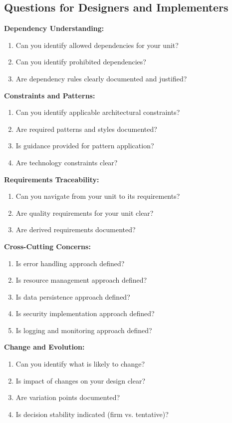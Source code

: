 \documentclass[11pt]{article}
\begin{document}
\subsection{Questions for Designers and Implementers}

\begin{questionbox}

\textbf{Dependency Understanding:}
\begin{enumerate}
    \item Can you identify allowed dependencies for your unit?
    \item Can you identify prohibited dependencies?
    \item Are dependency rules clearly documented and justified?
\end{enumerate}

\textbf{Constraints and Patterns:}
\begin{enumerate}[resume]
    \item Can you identify applicable architectural constraints?
    \item Are required patterns and styles documented?
    \item Is guidance provided for pattern application?
    \item Are technology constraints clear?
\end{enumerate}

\textbf{Requirements Traceability:}
\begin{enumerate}[resume]
    \item Can you navigate from your unit to its requirements?
    \item Are quality requirements for your unit clear?
    \item Are derived requirements documented?
\end{enumerate}

\textbf{Cross-Cutting Concerns:}
\begin{enumerate}[resume]
    \item Is error handling approach defined?
    \item Is resource management approach defined?
    \item Is data persistence approach defined?
    \item Is security implementation approach defined?
    \item Is logging and monitoring approach defined?
\end{enumerate}

\textbf{Change and Evolution:}
\begin{enumerate}[resume]
    \item Can you identify what is likely to change?
    \item Is impact of changes on your design clear?
    \item Are variation points documented?
    \item Is decision stability indicated (firm vs. tentative)?
\end{enumerate}


\end{questionbox}
\end{document}
